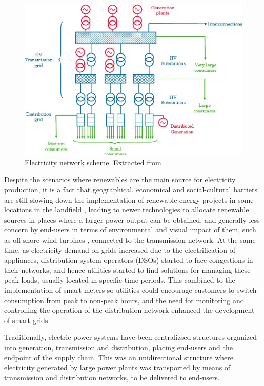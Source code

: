 \begin{figure}[htbp]
	\centering 
	\includegraphics[width=0.6\columnwidth ]{ChapterIntro/Figures/ELECTRICITY_SYSTEM.jpg}
		\caption{Electricity network scheme. Extracted from \cite{Erbach2016}}  
		\label{fig:networkscheme}
\end{figure}


Despite the scenarios where renewables are the main source for electricity production, it is a fact that geographical, economical and social-cultural barriers are still slowing down the implementation of renewable energy projects in some locations in the landfield \cite{ASANTE2020111479, barriers2020}, leading to newer technologies to allocate renewable sources in places where a larger power output can be obtained, and generally less concern by end-users in terms of environmental and visual impact of them, such as off-shore wind turbines \cite{Kaldellis2016, KPMG2019}, connected to the transmission network. At the same time, as electricity demand on grids increased due to the electrification of appliances, distribution system operators (DSOs) started to face congestions in their networks, and hence utilities started to find solutions for managing these peak loads, usually located in specific time periods.  This combined to the implementation of smart meters so utilities could encourage customers to switch consumption from peak to non-peak hours, and the need for monitoring and controlling the operation of the distribution network enhanced the development of smart grids.

Traditionally, electric power systems have been centralizsed structures organized into generation, transmission and distribution, placing end-users and the endpoint of the supply chain. This was an unidirectional structure where electricity generated by large power plants was transported by means of transmission and distribution networks, to be delivered to end-users. 

